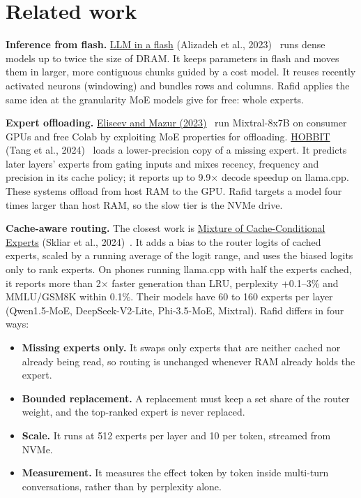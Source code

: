 \section{Related work}
\textbf{Inference from flash.} \href{https://arxiv.org/abs/2312.11514}{LLM in a flash} (Alizadeh et al., 2023)~\cite{alizadeh2023} runs dense models up to twice the size of DRAM. It keeps parameters in flash and moves them in larger, more contiguous chunks guided by a cost model. It reuses recently activated neurons (windowing) and bundles rows and columns. Rafid applies the same idea at the granularity MoE models give for free: whole experts.

\textbf{Expert offloading.} \href{https://arxiv.org/abs/2312.17238}{Eliseev and Mazur (2023)}~\cite{eliseev2023} run Mixtral-8x7B on consumer GPUs and free Colab by exploiting MoE properties for offloading. \href{https://arxiv.org/html/2411.01433v2}{HOBBIT} (Tang et al., 2024)~\cite{tang2024} loads a lower-precision copy of a missing expert. It predicts later layers' experts from gating inputs and mixes recency, frequency and precision in its cache policy; it reports up to 9.9$\times$ decode speedup on llama.cpp. These systems offload from host RAM to the GPU. Rafid targets a model four times larger than host RAM, so the slow tier is the NVMe drive.

\textbf{Cache-aware routing.} The closest work is \href{https://arxiv.org/abs/2412.00099v2}{Mixture of Cache-Conditional Experts} (Skliar et al., 2024)~\cite{skliar2024}. It adds a bias to the router logits of cached experts, scaled by a running average of the logit range, and uses the biased logits only to rank experts. On phones running llama.cpp with half the experts cached, it reports more than 2$\times$ faster generation than LRU, perplexity +0.1--3\% and MMLU/GSM8K within 0.1\%. Their models have 60 to 160 experts per layer (Qwen1.5-MoE, DeepSeek-V2-Lite, Phi-3.5-MoE, Mixtral). Rafid differs in four ways:

\begin{itemize}
  \item \textbf{Missing experts only.} It swaps only experts that are neither cached nor already being read, so routing is unchanged whenever RAM already holds the expert.
  \item \textbf{Bounded replacement.} A replacement must keep a set share of the router weight, and the top-ranked expert is never replaced.
  \item \textbf{Scale.} It runs at 512 experts per layer and 10 per token, streamed from NVMe.
  \item \textbf{Measurement.} It measures the effect token by token inside multi-turn conversations, rather than by perplexity alone.
\end{itemize}

